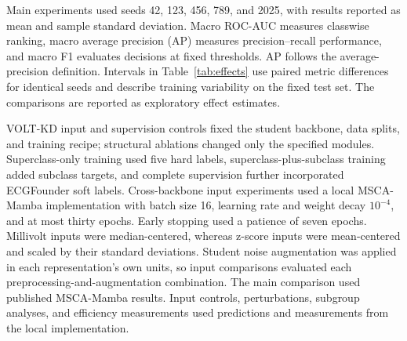 \documentclass[11pt,a4paper]{article}
\begin{document}
Main experiments used seeds 42, 123, 456, 789, and 2025, with results reported as mean and sample standard deviation. Macro ROC-AUC measures classwise ranking, macro average precision (AP) measures precision--recall performance, and macro F1 evaluates decisions at fixed thresholds. AP follows the average-precision definition. Intervals in Table~\ref{tab:effects} use paired metric differences for identical seeds and describe training variability on the fixed test set. The comparisons are reported as exploratory effect estimates.

VOLT-KD input and supervision controls fixed the student backbone, data splits, and training recipe; structural ablations changed only the specified modules. Superclass-only training used five hard labels, superclass-plus-subclass training added subclass targets, and complete supervision further incorporated ECGFounder soft labels. Cross-backbone input experiments used a local MSCA-Mamba implementation with batch size 16, learning rate and weight decay $10^{-4}$, and at most thirty epochs. Early stopping used a patience of seven epochs. Millivolt inputs were median-centered, whereas z-score inputs were mean-centered and scaled by their standard deviations. Student noise augmentation was applied in each representation's own units, so input comparisons evaluated each preprocessing-and-augmentation combination. The main comparison used published MSCA-Mamba results. Input controls, perturbations, subgroup analyses, and efficiency measurements used predictions and measurements from the local implementation.
\end{document}
